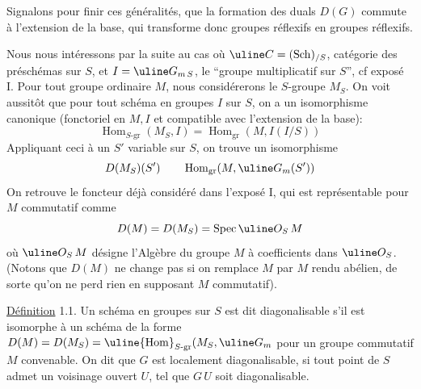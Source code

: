 Signalons pour finir ces généralités, que la formation des duals
$D(G)$ commute à l'extension de la base, qui transforme donc groupes
réflexifs en groupes réflexifs.

Nous nous intéressons par la suite au cas où
$\uline C=(\mathrm{Sch})_{/S}$, catégorie
des préschémas sur $S$, et $I=\uline G_{m\,S}$,
le ``groupe multiplicatif sur $S$'',
cf exposé I. Pour tout groupe  ordinaire $M$, nous considérerons
le $S$-groupe $M_S$. On voit aussitôt que pour tout schéma en groupes
$I$ sur $S$, on a un isomorphisme canonique
(fonctoriel en $M,I$ et compatible avec l'extension de la base):
\[
\operatorname{Hom}_{S\text{-gr}}(M_S,I)
=\operatorname{Hom}_{\mathrm{gr}}(M,I(I/S))
\]
Appliquant ceci à un $S'$ variable sur $S$, on trouve un isomorphisme
\[
D(M_S)(S')\qquad\operatorname{Hom}_{\mathrm{gr}}(M,\uline G_m(S'))
\]
On retrouve le foncteur déjà considéré dans l'exposé I,
qui est représentable 
pour $M$ commutatif comme
\[
D(M)=D(M_S)=\operatorname{Spec}\uline O_S\,M
\]
où $\uline O_S\,M$ désigne l'Algèbre du groupe $M$ à coefficients dans
$\uline O_S$. (Notons
que $D(M)$ ne change pas si on remplace $M$ par $M$ rendu
abélien, de sorte 
qu'on ne perd rien en supposant $M$ commutatif).

\uline{Définition} 1.1. Un schéma en groupes  sur $S$ est dit diagonalisable
s'il est isomorphe à un schéma de la forme 
$D(M)=D(M_S)=\uline{\operatorname{Hom}}_{S\text{-gr}}(M_S,\uline G_m$
pour un groupe commutatif $M$ convenable. On dit que $G$ est localement
diagonalisable, si tout point de $S$ admet un voisinage ouvert $U$, tel que
$G\,U$ soit diagonalisable.

